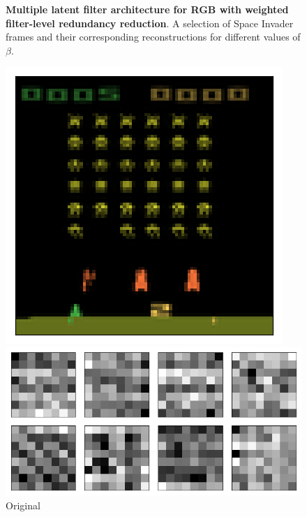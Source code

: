 \begin{figure}[h!]
\begin{multicols}{4}
    \caption{$\beta = 4$}
\end{multicols}
\caption{\textbf{Multiple latent filter architecture for RGB with weighted filter-level redundancy reduction}. A selection of Space Invader frames and their corresponding reconstructions for different values of $\beta$.}
\label{fig:colour_separated_originals_and_reconstructions}
\end{figure}



\begin{figure}[h!]
\centering
\captionsetup{justification=centering}
\begin{minipage}{0.4\textwidth}
\centering
\captionsetup{justification=centering}
\includegraphics[scale=0.4]{figures/results/colour_separated/beta_1_sample_3_original.png}
\caption{Original}
\end{minipage}
\begin{minipage}{0.55\textwidth}
\centering
\captionsetup{justification=centering}
\includegraphics[scale=0.42]{figures/results/colour_separated/beta_1_convolutional_layers_sample_3.png}

\end{minipage}
\end{figure}
